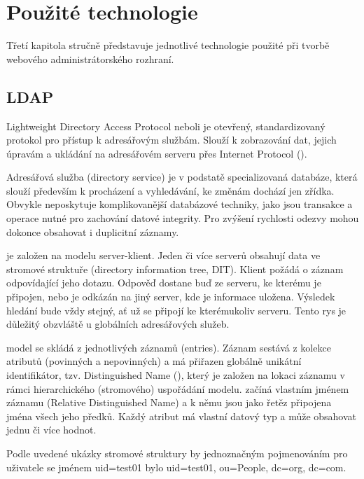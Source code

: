 \chapter{Použité technologie}
\label{3-technologie}

Třetí kapitola stručně představuje jednotlivé technologie použité při
tvorbě webového administrátorského rozhraní.

\section{LDAP}

Lightweight Directory Access Protocol neboli  je otevřený,
standardizovaný protokol pro přístup k adresářovým službám. Slouží k
zobrazování dat, jejich úpravám a ukládání na adresářovém serveru přes
Internet Protocol ().

Adresářová služba (directory service) je v podstatě specializovaná
databáze, která slouží především k procházení a vyhledávání, ke změnám
dochází jen zřídka. Obvykle neposkytuje komplikovanější databázové
techniky, jako jsou transakce a operace nutné pro zachování datové
integrity. Pro zvýšení rychlosti odezvy mohou dokonce obsahovat i
duplicitní záznamy.

 je založen na modelu server-klient. Jeden či více 
serverů obsahují data ve stromové struktuře (directory information
tree, DIT). Klient požádá o záznam odpovídající jeho dotazu. Odpověď
dostane buď ze serveru, ke kterému je připojen, nebo je odkázán na
jiný server, kde je informace uložena. Výsledek hledání bude vždy
stejný, ať už se připojí ke kterémukoliv serveru. Tento rys je
důležitý obzvláště u globálních adresářových služeb.

 model se skládá z jednotlivých záznamů (entries). Záznam
sestává z kolekce atributů (povinných a nepovinných) a má přiřazen
globálně unikátní identifikátor, tzv. Distinguished Name (),
který je založen na lokaci záznamu v rámci hierarchického (stromového)
uspořádání modelu.  začíná vlastním jménem záznamu (Relative
Distinguished Name) a k němu jsou jako řetěz připojena jména všech
jeho předků. Každý atribut má vlastní datový typ a může obsahovat
jednu či více hodnot.

Podle uvedené ukázky stromové struktury by jednoznačným pojmenováním
pro uživatele se jménem \textsf{uid=test01} bylo 
\textsf{uid=test01, ou=People, dc=org, dc=com}.

